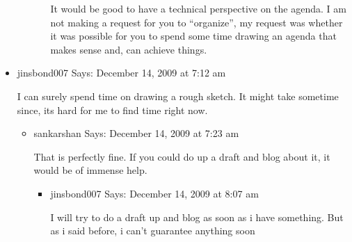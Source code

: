 \begin{english}
\begin{itemize}
\begin{itemize}
\begin{itemize}
        It would be good to have a technical perspective on the agenda. I am not making a request for you to “organize”, my request was whether it was possible for you to spend some time drawing an agenda that makes sense and, can achieve things.
	\end{itemize}
    \end{itemize}

\item jinsbond007 Says:
December 14, 2009 at 7:12 am

I can surely spend time on drawing a rough sketch.
It might take sometime since, its hard for me to find time right now.

    \begin{itemize}
    \item sankarshan Says:
    December 14, 2009 at 7:23 am

    That is perfectly fine. If you could do up a draft and blog about it, it would be of immense help.
	\begin{itemize}
        \item jinsbond007 Says:
        December 14, 2009 at 8:07 am

        I will try to do a draft up and blog as soon as i have something. But as i said before, i can’t guarantee anything soon
	\end{itemize}
    \end{itemize}
\end{itemize}
\end{english}
